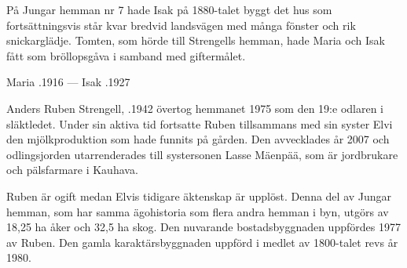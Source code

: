 På Jungar hemman nr 7 hade Isak på 1880-talet byggt det hus som fortsättningsvis står kvar bredvid landsvägen med många fönster och rik snickarglädje. Tomten, som hörde till Strengells hemman, hade Maria och Isak fått som bröllopsgåva i samband med giftermålet.
\begin{jhchildren}
  \item {}
  \item {}
  \item {}
  \item {}
  \item {}
  \item {}
  \item {}
  \item {}
  \item {}
  \item {}
  \item {}
\end{jhchildren}

Maria .1916  ---  Isak .1927






Anders Ruben Strengell, .1942 övertog hemmanet 1975 som den 19:e odlaren i släktledet. Under sin aktiva tid fortsatte Ruben tillsammans med sin syster Elvi den mjölkproduktion som hade funnits på gården. Den avvecklades år 2007 och odlingsjorden utarrenderades till systersonen Lasse Mäenpää, som är jordbrukare och pälsfarmare i Kauhava.

Ruben är ogift medan Elvis tidigare äktenskap är upplöst. Denna del av Jungar hemman, som har samma ägohistoria som flera andra hemman i byn, utgörs av 18,25 ha åker och 32,5 ha skog. Den nuvarande bostadsbyggnaden uppfördes 1977 av Ruben. Den gamla karaktärsbyggnaden uppförd i medlet av 1800-talet revs år 1980.


